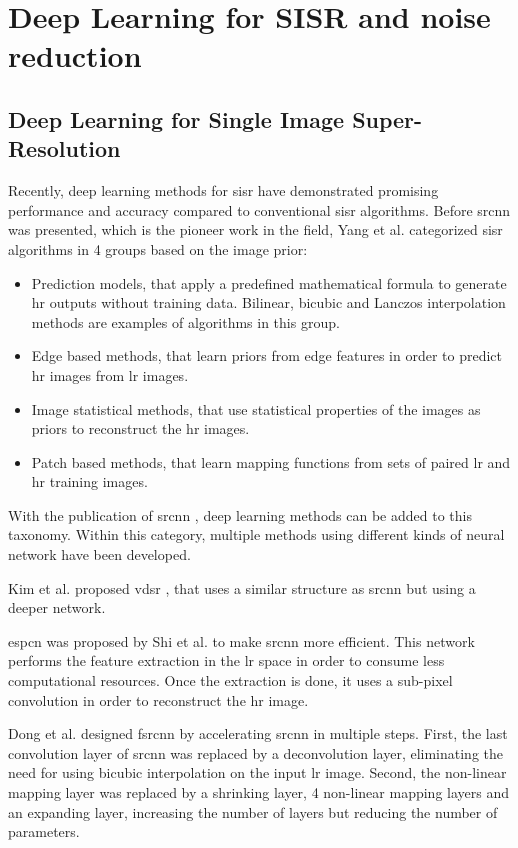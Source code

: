 \section{Deep Learning for SISR and noise reduction}\label{sec:deep_learning}

\subsection{Deep Learning for Single Image Super-Resolution}
Recently, deep learning methods for \gls{sisr} have demonstrated promising performance and accuracy compared to conventional \gls{sisr} algorithms. Before \gls{srcnn} \cite{SRCNN} was presented, which is the pioneer work in the field, Yang et al. \cite{SISRBENCH} categorized \gls{sisr} algorithms in 4 groups based on the image prior:
\begin{itemize}
	\item Prediction models, that apply a predefined mathematical formula to generate \gls{hr} outputs without training data. Bilinear, bicubic and Lanczos interpolation methods are examples of algorithms in this group.
	\item Edge based methods, that learn priors from edge features in order to predict \gls{hr} images from \gls{lr} images.
	\item Image statistical methods, that use statistical properties of the images as priors to reconstruct the \gls{hr} images.
	\item Patch based methods, that learn mapping functions from sets of paired \gls{lr} and \gls{hr} training images.
\end{itemize}

With the publication of \gls{srcnn} \cite{SRCNN}, deep learning methods can be added to this taxonomy. Within this category, multiple methods using different kinds of neural network have been developed. 

Kim et al. proposed \gls{vdsr} \cite{VDSR}, that uses a similar structure as \gls{srcnn} but using a deeper network.

\gls{espcn} \cite{ESPCN} was proposed by Shi et al. to make \gls{srcnn} more efficient. This network performs the feature extraction in the \gls{lr} space in order to consume less computational resources. Once the extraction is done, it uses a sub-pixel convolution in order to reconstruct the \gls{hr} image.

Dong et al. designed \gls{fsrcnn} \cite{FSRCNN} by accelerating \gls{srcnn} \cite{SRCNN} in multiple steps. First, the last convolution layer of \gls{srcnn} was replaced by a deconvolution layer, eliminating the need for using bicubic interpolation on the input \gls{lr} image. Second, the non-linear mapping layer was replaced by a shrinking layer, 4 non-linear mapping layers and an expanding layer, increasing the number of layers but reducing the number of parameters.

